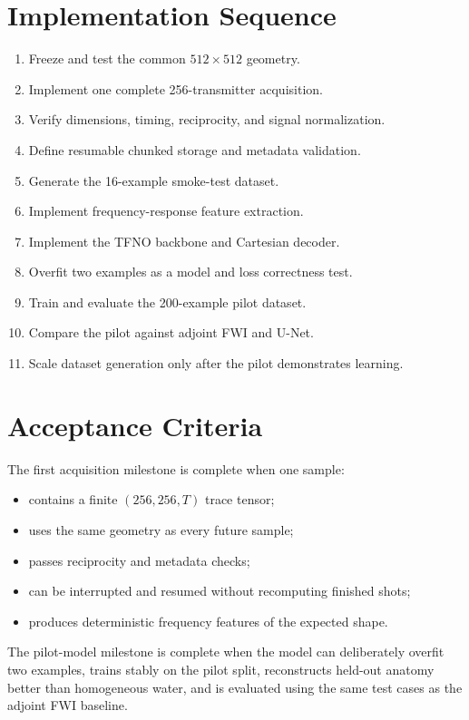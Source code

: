 \documentclass[11pt]{article}
\begin{document}
\section{Implementation Sequence}

\begin{enumerate}
  \item Freeze and test the common $512\times512$ geometry.
  \item Implement one complete 256-transmitter acquisition.
  \item Verify dimensions, timing, reciprocity, and signal normalization.
  \item Define resumable chunked storage and metadata validation.
  \item Generate the 16-example smoke-test dataset.
  \item Implement frequency-response feature extraction.
  \item Implement the TFNO backbone and Cartesian decoder.
  \item Overfit two examples as a model and loss correctness test.
  \item Train and evaluate the 200-example pilot dataset.
  \item Compare the pilot against adjoint FWI and U-Net.
  \item Scale dataset generation only after the pilot demonstrates learning.
\end{enumerate}

\section{Acceptance Criteria}

The first acquisition milestone is complete when one sample:
\begin{itemize}
  \item contains a finite $(256,256,T)$ trace tensor;
  \item uses the same geometry as every future sample;
  \item passes reciprocity and metadata checks;
  \item can be interrupted and resumed without recomputing finished shots;
  \item produces deterministic frequency features of the expected shape.
\end{itemize}

The pilot-model milestone is complete when the model can deliberately overfit
two examples, trains stably on the pilot split, reconstructs held-out anatomy
better than homogeneous water, and is evaluated using the same test cases as
the adjoint FWI baseline.
\end{document}
